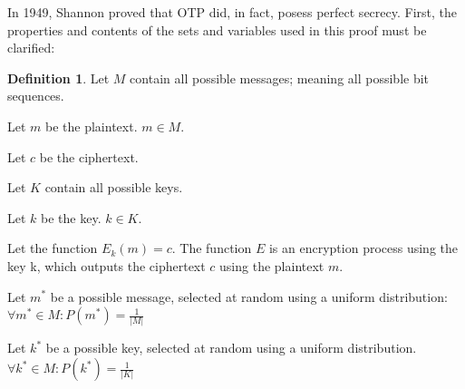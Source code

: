 \documentclass[12pt]{report}
\theoremstyle{definition}
\newtheorem{defin}[thm]{Definition}
\theoremstyle{remark}
\begin{document}

%


In 1949, Shannon proved that OTP did, in fact, posess perfect secrecy\cite{ShannonOTP}. First, the properties and contents of the sets and variables used in this proof must be clarified:

\begin{defin}
Let $M$ contain all possible messages; meaning all possible bit sequences.

Let $m$ be the plaintext. $m \in M$.

Let $c$ be the ciphertext.

Let $K$ contain all possible keys.

Let $k$ be the key. $k \in K$.

Let the function ${E_k}(m)=c$. The function $E$ is an encryption process using the key k, which outputs the ciphertext $c$ using the plaintext $m$.

Let $m^{*}$ be a possible message, selected at random using a uniform distribution:
$\forall m^{*} \in M: P(m^{*})=\frac{1}{\lvert M \rvert}$

Let $k^{*}$ be a possible key, selected at random using a uniform distribution.
$\forall k^{*} \in M: P(k^{*})=\frac{1}{\lvert K \rvert}$
\end{defin}
\end{document}
